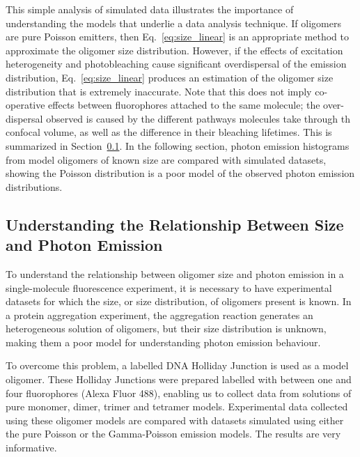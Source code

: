 This simple analysis of simulated data illustrates the importance of understanding the models that underlie a data analysis technique. If oligomers are pure Poisson emitters, then Eq.~\ref{eq:size_linear} is an appropriate method to approximate the oligomer size distribution. However, if the effects of excitation heterogeneity and photobleaching cause significant overdispersal of the emission distribution, Eq.~\ref{eq:size_linear} produces an estimation of the oligomer size distribution that is extremely inaccurate. Note that this does not imply co-operative effects between fluorophores attached to the same molecule; the over-dispersal observed is caused by the different pathways molecules take through th confocal volume, as well as the difference in their bleaching lifetimes. This is summarized in Section~\ref{subsec:understanding_overdispersal}.  In the following section, photon emission histograms from model oligomers of known size are compared with simulated datasets, showing the Poisson distribution is a poor model of the observed photon emission distributions. 

\clearpage  

\subsection{Understanding the Relationship Between Size and Photon Emission}
\label{subsec:understanding_overdispersal}
To understand the relationship between oligomer size and photon emission in a single-molecule fluorescence experiment, it is necessary to have experimental datasets for which the size, or size distribution, of oligomers present is known. In a protein aggregation experiment, the aggregation reaction generates an heterogeneous solution of oligomers, but their size distribution is unknown, making them a poor model for understanding photon emission behaviour. 

To overcome this problem, a labelled DNA Holliday Junction is used as a model oligomer. These Holliday Junctions were prepared labelled with between one and four fluorophores (Alexa Fluor 488), enabling us to collect data from solutions of pure monomer, dimer, trimer and tetramer models. Experimental data collected using these oligomer models are compared with datasets simulated using either the pure Poisson or the Gamma-Poisson emission models. The results are very informative.

